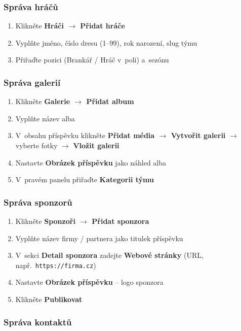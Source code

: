 \documentclass[12pt,a4paper]{article}
\begin{document}
\subsubsection{Správa hráčů}

\begin{enumerate}
    \item Klikněte \textbf{Hráči $\rightarrow$ Přidat hráče}
    \item Vyplňte jméno, číslo dresu (1--99), rok narození, slug týmu
    \item Přiřaďte pozici (Brankář / Hráč v~poli) a~sezónu
\end{enumerate}

\subsubsection{Správa galerií}

\begin{enumerate}
    \item Klikněte \textbf{Galerie $\rightarrow$ Přidat album}
    \item Vyplňte název alba
    \item V~obsahu příspěvku klikněte \textbf{Přidat média $\rightarrow$ Vytvořit galerii} $\rightarrow$ vyberte fotky $\rightarrow$ \textbf{Vložit galerii}
    \item Nastavte \textbf{Obrázek příspěvku} jako náhled alba
    \item V~pravém panelu přiřaďte \textbf{Kategorii týmu}
\end{enumerate}

\subsubsection{Správa sponzorů}

\begin{enumerate}
    \item Klikněte \textbf{Sponzoři $\rightarrow$ Přidat sponzora}
    \item Vyplňte název firmy / partnera jako titulek příspěvku
    \item V~sekci \textbf{Detail sponzora} zadejte \textbf{Webové stránky} (URL, např.\ \texttt{https://firma.cz})
    \item Nastavte \textbf{Obrázek příspěvku} -- logo sponzora
    \item Klikněte \textbf{Publikovat}
\end{enumerate}

\subsubsection{Správa kontaktů}
\end{document}
